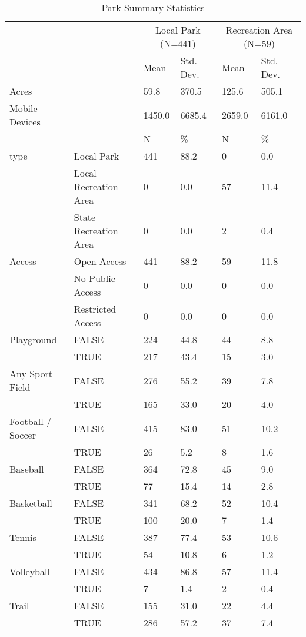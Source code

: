\documentclass[3p, authoryear, review]{elsarticle} %
\begin{document}
\begin{table}

\caption{\label{tab:park-attributes}Park Summary Statistics}
\centering
\begin{tabular}[t]{llllll}
\toprule
\multicolumn{2}{c}{ } & \multicolumn{2}{c}{Local Park (N=441)} & \multicolumn{2}{c}{Recreation Area (N=59)} \\
\cmidrule(l{3pt}r{3pt}){3-4} \cmidrule(l{3pt}r{3pt}){5-6}
  &    & Mean & Std. Dev. & Mean  & Std. Dev. \\
\midrule
Acres &  & 59.8 & 370.5 & 125.6 & 505.1\\
Mobile Devices &  & 1450.0 & 6685.4 & 2659.0 & 6161.0\\
\midrule
 &  & N & \% & N & \%\\
type & Local Park & 441 & 88.2 & 0 & 0.0\\
 & Local Recreation Area & 0 & 0.0 & 57 & 11.4\\
 & State Recreation Area & 0 & 0.0 & 2 & 0.4\\
Access & Open Access & 441 & 88.2 & 59 & 11.8\\
 & No Public Access & 0 & 0.0 & 0 & 0.0\\
 & Restricted Access & 0 & 0.0 & 0 & 0.0\\
Playground & FALSE & 224 & 44.8 & 44 & 8.8\\
 & TRUE & 217 & 43.4 & 15 & 3.0\\
Any Sport Field & FALSE & 276 & 55.2 & 39 & 7.8\\
 & TRUE & 165 & 33.0 & 20 & 4.0\\
Football / Soccer & FALSE & 415 & 83.0 & 51 & 10.2\\
 & TRUE & 26 & 5.2 & 8 & 1.6\\
Baseball & FALSE & 364 & 72.8 & 45 & 9.0\\
 & TRUE & 77 & 15.4 & 14 & 2.8\\
Basketball & FALSE & 341 & 68.2 & 52 & 10.4\\
 & TRUE & 100 & 20.0 & 7 & 1.4\\
Tennis & FALSE & 387 & 77.4 & 53 & 10.6\\
 & TRUE & 54 & 10.8 & 6 & 1.2\\
Volleyball & FALSE & 434 & 86.8 & 57 & 11.4\\
 & TRUE & 7 & 1.4 & 2 & 0.4\\
Trail & FALSE & 155 & 31.0 & 22 & 4.4\\
 & TRUE & 286 & 57.2 & 37 & 7.4\\
\bottomrule
\end{tabular}
\end{table}
\end{document}
